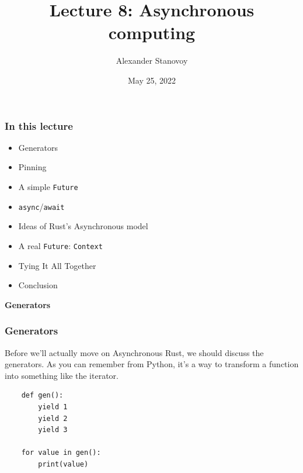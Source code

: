\documentclass[aspectratio=1610,t]{beamer}
\title{Lecture 8: Asynchronous computing}
\date{May 25, 2022}
\author{Alexander Stanovoy}
\institute{alex.stanovoy@gmail.com}
\begin{document}

\begin{frame}
\maketitle
\end{frame}


\begin{frame}[fragile]
\frametitle{In this lecture}
\begin{itemize}
    \item Generators
    \item Pinning
    \item A simple \texttt{Future}
    \item \texttt{async}/\texttt{await}
    \item Ideas of Rust's Asynchronous model
    \item A real \texttt{Future}: \texttt{Context}
    \item Tying It All Together
    \item Conclusion
\end{itemize}
\end{frame}


\begin{frame}[c]
\centering\Huge\textbf{Generators}
\end{frame}


\begin{frame}[fragile]
\frametitle{Generators}
Before we'll actually move on Asynchronous Rust, we should discuss the generators. As you can remember from Python, it's a way to transform a function into something like the iterator.

\begin{verbatim}
    def gen():
        yield 1            
        yield 2            
        yield 3            

    for value in gen(): 
        print(value)
\end{verbatim}
\end{frame}

\end{document}
